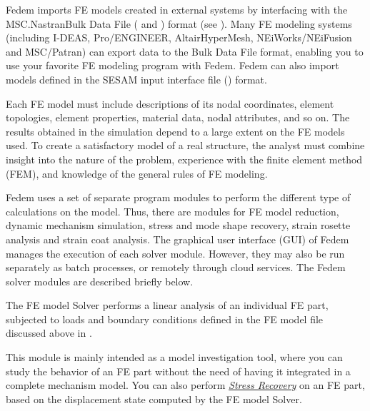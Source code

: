 
Fedem imports FE models created in external systems by interfacing with
the MSC.Nastran\Registered Bulk Data File ( and ) format
(see ).
Many FE modeling systems (including I-DEAS\Registered, Pro/ENGINEER\Registered,
Altair\Registered HyperMesh\Registered, NEiWorks/NEiFusion and
MSC/Patran\Registered) can export data to the Bulk Data File format,
enabling you to use your favorite FE modeling program with Fedem.
Fedem can also import models defined in the SESAM input interface file
() format.

Each FE model must include descriptions of its nodal coordinates, element
topologies, element properties, material data, nodal attributes, and so on.
The results obtained in the simulation depend to a large extent on the
FE models used. To create a satisfactory model of a real structure,
the analyst must combine insight into the nature of the problem,
experience with the finite element method (FEM), and knowledge of
the general rules of FE modeling.



Fedem uses a set of separate program modules to perform the different type of
calculations on the model. Thus, there are modules for FE model reduction,
dynamic mechanism simulation, stress and mode shape recovery, strain rosette
analysis and strain coat analysis. The graphical user interface (GUI) of Fedem
manages the execution of each solver module. However, they may also be run
separately as batch processes, or remotely through cloud services.
The Fedem solver modules are described briefly below.




The FE model Solver performs a linear analysis of an individual FE part,
subjected to loads and boundary conditions defined in the FE model file
discussed above in .

This module is mainly intended as a model investigation tool, where you can
study the behavior of an FE part without the need of having it
integrated in a complete mechanism model.
You can also perform {\sl\protect\hyperlink{stress-recovery}{Stress Recovery}}
on an FE part, based on the displacement state computed by the FE model Solver.



